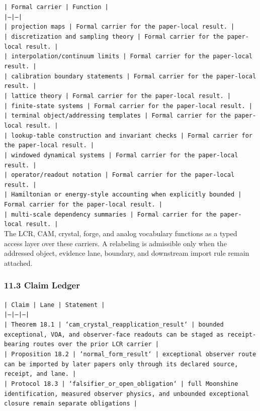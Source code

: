 \documentclass[11pt]{article}
\begin{document}
\noindent\texttt{| Formal carrier | Function |}\\
\noindent\texttt{|---|---|}\\
\noindent\texttt{| projection maps | Formal carrier for the paper-local result. |}\\
\noindent\texttt{| discretization and sampling theory | Formal carrier for the paper-local result. |}\\
\noindent\texttt{| interpolation/continuum limits | Formal carrier for the paper-local result. |}\\
\noindent\texttt{| calibration boundary statements | Formal carrier for the paper-local result. |}\\
\noindent\texttt{| lattice theory | Formal carrier for the paper-local result. |}\\
\noindent\texttt{| finite-state systems | Formal carrier for the paper-local result. |}\\
\noindent\texttt{| terminal object/addressing templates | Formal carrier for the paper-local result. |}\\
\noindent\texttt{| lookup-table construction and invariant checks | Formal carrier for the paper-local result. |}\\
\noindent\texttt{| windowed dynamical systems | Formal carrier for the paper-local result. |}\\
\noindent\texttt{| operator/readout notation | Formal carrier for the paper-local result. |}\\
\noindent\texttt{| Hamiltonian or energy-style accounting when explicitly bounded | Formal carrier for the paper-local result. |}\\
\noindent\texttt{| multi-scale dependency summaries | Formal carrier for the paper-local result. |}\\

The LCR, CAM, crystal, forge, and analog vocabulary functions as a typed access
layer over these carriers. A relabeling is admissible only when the addressed
object, evidence lane, boundary, and downstream import rule remain attached.

\subsubsection*{11.3 Claim Ledger}

\noindent\texttt{| Claim | Lane | Statement |}\\
\noindent\texttt{|---|---|---|}\\
\noindent\texttt{| Theorem 18.1 | `cam\_crystal\_reapplication\_result` | bounded exceptional, VOA, and observer-face readouts can be staged as receipt-bearing routes over the prior LCR carrier |}\\
\noindent\texttt{| Proposition 18.2 | `normal\_form\_result` | exceptional observer route can be imported by later papers only through its declared source, receipt, and lane. |}\\
\noindent\texttt{| Protocol 18.3 | `falsifier\_or\_open\_obligation` | full Moonshine identification, measured observer physics, and unbounded exceptional closure remain separate obligations |}\\
\end{document}

